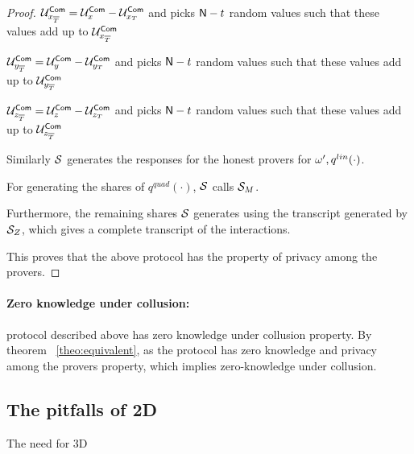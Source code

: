 \begin{proof}
	$\mathcal{U}^{\mathsf{Com}}_{x_{\overline{T}}} = \mathcal{U}^{\mathsf{Com}}_{x}-\mathcal{U}^{\mathsf{Com}}_{x_{T}}$
	and picks $\mathsf{N} - t$ random values such that these values add up to $\mathcal{U}^{\mathsf{Com}}_{x_{\overline{T}}}$
	
	$\mathcal{U}^{\mathsf{Com}}_{y_{\overline{T}}} = \mathcal{U}^{\mathsf{Com}}_{y}-\mathcal{U}^{\mathsf{Com}}_{y_{T}}$
	and picks $\mathsf{N} - t$ random values such that these values add up to $\mathcal{U}^{\mathsf{Com}}_{y_{\overline{T}}}$
	
	$\mathcal{U}^{\mathsf{Com}}_{z_{\overline{T}}} = \mathcal{U}^{\mathsf{Com}}_{z}-\mathcal{U}^{\mathsf{Com}}_{z_{T}}$
	and picks $\mathsf{N} - t$ random values such that these values add up to $\mathcal{U}^{\mathsf{Com}}_{z_{\overline{T}}}$
	
	Similarly $\mathcal{S}$ generates the responses for the honest provers for $\omega', q^{lin}(\cdot)$. 
	
	For generating the shares of $q^{quad}(\cdot)$, $\mathcal{S}$ calls $\mathcal{S}_{M}$.
	
	Furthermore, the remaining shares $\mathcal{S}$ generates using the transcript generated by $\mathcal{S}_{Z}$, which gives a complete transcript of the interactions.
	
	This proves that the above protocol has the property of privacy among the provers. 
\end{proof}

\paragraph{Zero knowledge under collusion: } protocol described above has zero knowledge under collusion property. By theorem ~\ref{theo:equivalent}, as the protocol has zero knowledge and privacy among the provers property, which implies zero-knowledge under collusion.

\subsection{The pitfalls of 2D}
The need for 3D